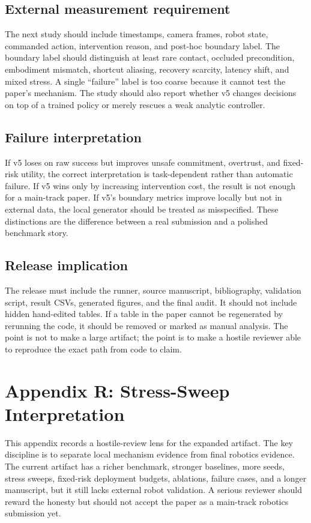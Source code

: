 \documentclass{article}
\begin{document}
\subsection{External measurement requirement}
The next study should include timestamps, camera frames, robot state, commanded action, intervention reason, and post-hoc boundary label. The boundary label should distinguish at least rare contact, occluded precondition, embodiment mismatch, shortcut aliasing, recovery scarcity, latency shift, and mixed stress. A single ``failure'' label is too coarse because it cannot test the paper's mechanism. The study should also report whether v5 changes decisions on top of a trained policy or merely rescues a weak analytic controller.

\subsection{Failure interpretation}
If v5 loses on raw success but improves unsafe commitment, overtrust, and fixed-risk utility, the correct interpretation is task-dependent rather than automatic failure. If v5 wins only by increasing intervention cost, the result is not enough for a main-track paper. If v5's boundary metrics improve locally but not in external data, the local generator should be treated as misspecified. These distinctions are the difference between a real submission and a polished benchmark story.

\subsection{Release implication}
The release must include the runner, source manuscript, bibliography, validation script, result CSVs, generated figures, and the final audit. It should not include hidden hand-edited tables. If a table in the paper cannot be regenerated by rerunning the code, it should be removed or marked as manual analysis. The point is not to make a large artifact; the point is to make a hostile reviewer able to reproduce the exact path from code to claim.


\section{Appendix R: Stress-Sweep Interpretation}
This appendix records a hostile-review lens for the expanded artifact. The key discipline is to separate local mechanism evidence from final robotics evidence. The current artifact has a richer benchmark, stronger baselines, more seeds, stress sweeps, fixed-risk deployment budgets, ablations, failure cases, and a longer manuscript, but it still lacks external robot validation. A serious reviewer should reward the honesty but should not accept the paper as a main-track robotics submission yet.
\end{document}
